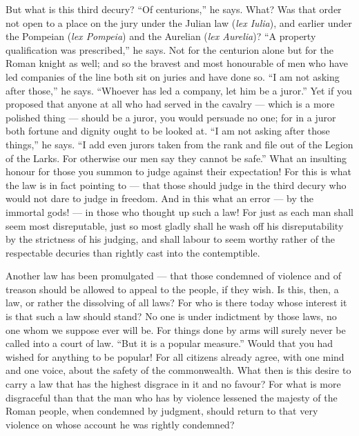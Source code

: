  But what is this third decury? ``Of centurions,'' he says. What? Was that order not open to a place on the jury under the Julian law (\textit{lex Iulia}), and earlier under the Pompeian (\textit{lex Pompeia}) and the Aurelian (\textit{lex Aurelia})? ``A property qualification was prescribed,'' he says. Not for the centurion alone but for the Roman knight as well; and so the bravest and most honourable of men who have led companies of the line both sit on juries and have done so. ``I am not asking after those,'' he says. ``Whoever has led a company, let him be a juror.'' Yet if you proposed that anyone at all who had served in the cavalry --- which is a more polished thing --- should be a juror, you would persuade no one; for in a juror both fortune and dignity ought to be looked at. ``I am not asking after those things,'' he says. ``I add even jurors taken from the rank and file out of the Legion of the Larks. For otherwise our men say they cannot be safe.'' What an insulting honour for those you summon to judge against their expectation! For this is what the law is in fact pointing to --- that those should judge in the third decury who would not dare to judge in freedom. And in this what an error --- by the immortal gods! --- in those who thought up such a law! For just as each man shall seem most disreputable, just so most gladly shall he wash off his disreputability by the strictness of his judging, and shall labour to seem worthy rather of the respectable decuries than rightly cast into the contemptible.

 Another law has been promulgated --- that those condemned of violence and of treason should be allowed to appeal to the people, if they wish. Is this, then, a law, or rather the dissolving of all laws? For who is there today whose interest it is that such a law should stand? No one is under indictment by those laws, no one whom we suppose ever will be. For things done by arms will surely never be called into a court of law. ``But it is a popular measure.'' Would that you had wished for anything to be popular! For all citizens already agree, with one mind and one voice, about the safety of the commonwealth. What then is this desire to carry a law that has the highest disgrace in it and no favour? For what is more disgraceful than that the man who has by violence lessened the majesty of the Roman people, when condemned by judgment, should return to that very violence on whose account he was rightly condemned?

